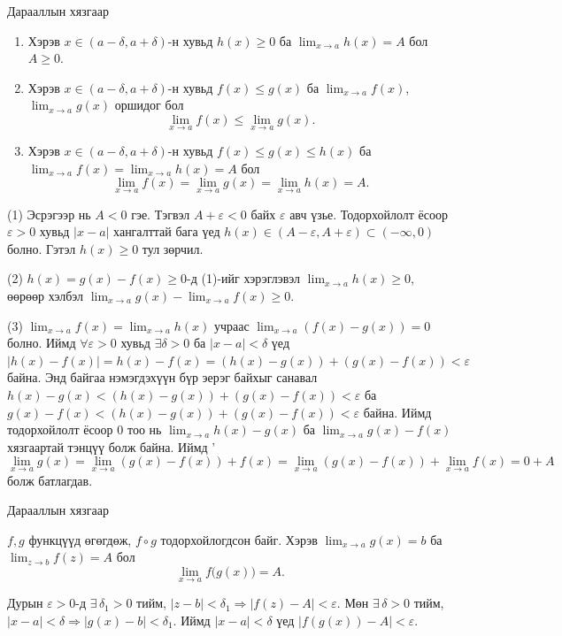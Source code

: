\begin{frame}[allowframebreaks]{Дарааллын хязгаар}
\begin{theorem}\label{ineqlim}
\begin{enumerate}[label=(\arabic*)]
\item Хэрэв $x\in (a-\delta,a+\delta)$-н хувьд $h(x)\ge 0$ ба $\lim_{x\to a} h(x)=A$ бол $A\ge 0$.
\item Хэрэв $x\in (a-\delta,a+\delta)$-н хувьд $f(x)\le g(x)$ ба $\lim_{x\to a} f(x)$, $\lim_{x\to a} g(x)$ оршидог бол 
\[
\lim_{x\to a} f(x)\le \lim_{x\to a} g(x).
\]
\item Хэрэв $x\in (a-\delta,a+\delta)$-н хувьд $f(x)\le g(x)\le h(x)$ ба $\lim_{x\to a} f(x)=\lim_{x\to a} h(x)=A$ бол
\[
\lim_{x\to a} f(x)=\lim_{x\to a} g(x)=\lim_{x\to a} h(x)=A.
\]
\end{enumerate}
\end{theorem}

\begin{prof}
(1) Эсрэгээр нь $A<0$ гэе. Тэгвэл $A+\varepsilon<0$ байх $\varepsilon$ авч үзье. Тодорхойлолт ёсоор $\varepsilon>0$ хувьд $|x-a|$ хангалттай бага үед $h(x)\in (A-\varepsilon,A+\varepsilon)\subset (-\infty,0)$ болно. Гэтэл $h(x)\ge 0$ тул зөрчил.

(2) $h(x)=g(x)-f(x)\ge 0$-д (1)-ийг хэрэглэвэл $\lim_{x\to a} h(x)\ge 0$, өөрөөр хэлбэл $\lim_{x\to a} g(x)-\lim_{x\to a} f(x)\ge 0$.

(3) $\lim_{x\to a} f(x)=\lim_{x\to a} h(x)$ учраас $\lim_{x\to a} (f(x)-g(x))=0$ болно. Иймд $\forall \varepsilon>0$ хувьд $\exists\delta >0$ ба  $|x-a|<\delta$ үед $|h(x)-f(x)|=h(x)-f(x)=(h(x)-g(x))+(g(x)-f(x))<\varepsilon$ байна. Энд байгаа нэмэгдэхүүн бүр эерэг байхыг санавал $h(x)-g(x)< (h(x)-g(x))+(g(x)-f(x))<\varepsilon$ ба $g(x)-f(x)< (h(x)-g(x))+(g(x)-f(x))<\varepsilon$ байна. Иймд тодорхойлолт ёсоор $0$ тоо нь  $\lim_{x\to a} h(x)-g(x)$ ба $\lim_{x\to a} g(x)-f(x)$ хязгаартай тэнцүү болж байна. Иймд '
$$\lim_{x\to a} g(x)=\lim_{x\to a} (g(x)-f(x))+f(x)=\lim_{x\to a} (g(x)-f(x))+\lim_{x\to a} f(x)=0+A$$ болж батлагдав.
\end{prof}
\end{frame}

\begin{frame}[allowframebreaks]{Дарааллын хязгаар}
\begin{theorem}\label{complim}
$f,g$ функцүүд өгөгдөж, $f\circ g$ тодорхойлогдсон байг. Хэрэв $\displaystyle\lim_{x\to a} g(x)=b$ ба $\displaystyle\lim_{z\to b} f(z)=A$ бол
\[
\lim_{x\to a} f\bigl(g(x)\bigr)=A.
\]
\end{theorem}

\begin{prof}
Дурын $\varepsilon>0$-д $\exists\,\delta_1>0$ тийм, $|z-b|<\delta_1\Rightarrow |f(z)-A|<\varepsilon$. Мөн $\exists\,\delta>0$ тийм, $|x-a|<\delta\Rightarrow |g(x)-b|<\delta_1$. Иймд $|x-a|<\delta$ үед $|f(g(x))-A|<\varepsilon$.
\end{prof}
\end{frame}

